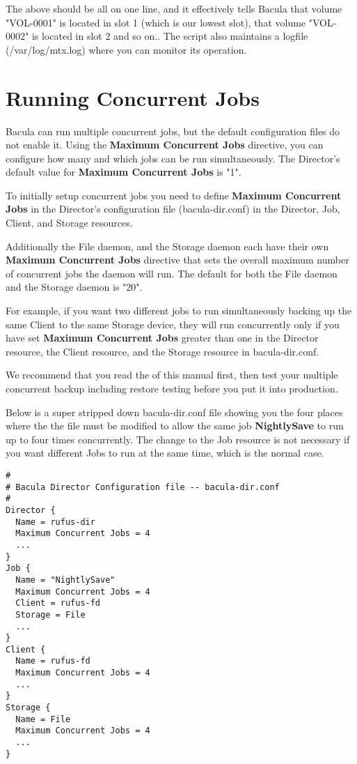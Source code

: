 The above should be all on one line, and it effectively tells Bacula that
volume "VOL-0001" is located in slot 1 (which is our lowest slot), that
volume "VOL-0002" is located in slot 2 and so on..
The script also maintains a logfile (/var/log/mtx.log) where you can monitor
its operation.

\section{Running Concurrent Jobs}
\label{ConcurrentJobs}

Bacula can run multiple concurrent jobs, but the default configuration files
do not enable it. Using the {\bf Maximum Concurrent Jobs} directive, you
can configure how many and which jobs can be run simultaneously. 
The Director's default value for {\bf Maximum Concurrent Jobs} is "1".

To initially setup concurrent jobs you need to define {\bf Maximum Concurrent Jobs} in 
the Director's configuration file (bacula-dir.conf) in the 
Director, Job, Client, and Storage resources.

Additionally the File daemon, and the Storage daemon each have their own
{\bf Maximum Concurrent Jobs} directive that sets the overall maximum
number of concurrent jobs the daemon will run.  The default for both the
File daemon and the Storage daemon is "20".

For example, if you want two different jobs to run simultaneously backing up
the same Client to the same Storage device, they will run concurrently only if
you have set {\bf Maximum Concurrent Jobs} greater than one in the Director
resource, the Client resource, and the Storage resource in bacula-dir.conf. 

We recommend that you read the  of this manual first, then test your multiple
concurrent backup including restore testing before you put it into
production.

Below is a super stripped down bacula-dir.conf file showing you the four
places where the the file must be modified to allow the same job {\bf
NightlySave} to run up to four times concurrently. The change to the Job
resource is not necessary if you want different Jobs to run at the same time,
which is the normal case. 

\footnotesize
\begin{verbatim}
#
# Bacula Director Configuration file -- bacula-dir.conf
#
Director {
  Name = rufus-dir
  Maximum Concurrent Jobs = 4
  ...
}
Job {
  Name = "NightlySave"
  Maximum Concurrent Jobs = 4
  Client = rufus-fd
  Storage = File
  ...
}
Client {
  Name = rufus-fd
  Maximum Concurrent Jobs = 4
  ...
}
Storage {
  Name = File
  Maximum Concurrent Jobs = 4
  ...
}
\end{verbatim}
\normalsize
